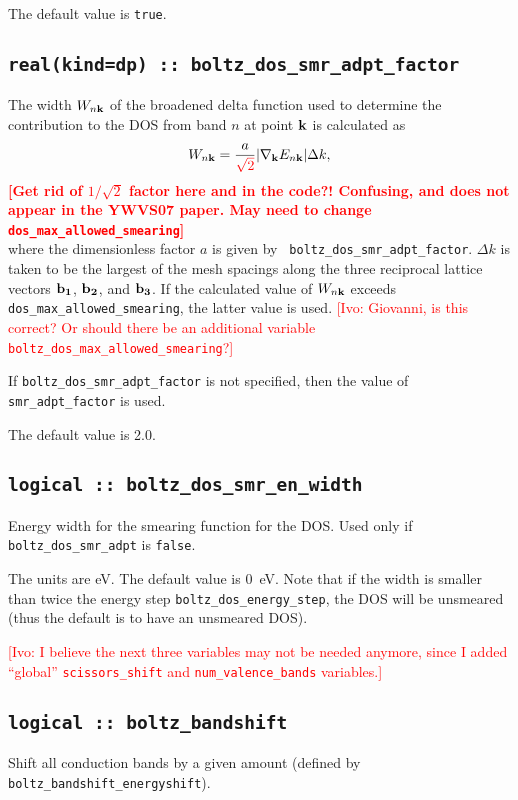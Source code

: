 The default value is \verb#true#.



\subsection[boltz\_dos\_smr\_adaptive]{\tt real(kind=dp) :: boltz\_dos\_smr\_adpt\_factor}

The width $W_{n{\bf k}}$ of the broadened delta function used to
determine the contribution to the DOS from band $n$ at point ${\bf k}$
is calculated as
%
$$
W_{n{\bf k}}=\frac{a}{\textcolor{red}{\sqrt{2}}}\vert
\nabla_{\bf k} E_{n{\bf k}}\vert \Delta k,
$$ 
%
\textcolor{red}{{\bf [Get rid of $1/\sqrt{2}$ factor here and in the
    code?!  Confusing, and does not appear in the YWVS07 paper. May
    need to change
    {\tt dos\_max\_allowed\_smearing}]}}\\
where the dimensionless factor $a$ is given by {\tt
  boltz\_dos\_smr\_adpt\_factor}. $\Delta k$ is taken to be the
largest of the mesh spacings along the three reciprocal lattice
vectors ${\bf b_1}$, ${\bf b_2}$, and ${\bf b_3}$.  If the calculated
value of $W_{n{\bf k}}$ exceeds {\tt dos\_max\_allowed\_smearing}, the
latter value is used.  \textcolor{red}{[Ivo: Giovanni, is this correct? Or
  should there be an additional variable {\tt
    boltz\_dos\_max\_allowed\_smearing}?]}


If {\tt boltz\_dos\_smr\_adpt\_factor} is not specified, then the value of {\tt
  smr\_adpt\_factor} is used.  

The default value is 2.0.

\subsection[boltz\_dos\_smr\_en\_width]{\tt logical :: boltz\_dos\_smr\_en\_width}
Energy width for the smearing function for the DOS. Used only if {\tt boltz\_dos\_smr\_adpt} is \verb#false#.

The units are eV.
The default value is 0~eV. Note that if the width is smaller than twice the energy step {\tt boltz\_dos\_energy\_step}, the DOS will be unsmeared (thus the default is to have an unsmeared DOS).

\textcolor{red}{[Ivo: I believe the next three variables may not be
  needed anymore, since I added ``global'' {\tt scissors\_shift} and
  {\tt num\_valence\_bands} variables.]}

\subsection[boltz\_bandshift]{\tt logical :: boltz\_bandshift}
Shift all conduction bands by a given amount (defined by {\tt boltz\_bandshift\_energyshift}).

